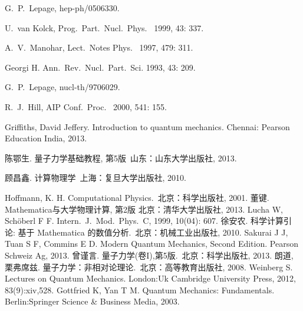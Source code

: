 \documentclass[cs4size,titlepage,twoside]{ctexart}
\begin{document}
\begin{thebibliography}{b}

	G.~P.~Lepage,
	hep-ph/0506330.

	U.~van Kolck,
	Prog.\ Part.\ Nucl.\ Phys.\  %
    1999, 43: 337.

     A.~V.~Manohar,
     Lect.\ Notes Phys.\  %
     1997, 479: 311.

	Georgi H.
    Ann.\ Rev.\ Nucl.\ Part.\ Sci. %
    1993, 43: 209.


	G.~P.~Lepage,
	nucl-th/9706029.

	R.~J.~Hill,
	AIP Conf.\ Proc.\  %
    2000, 541: 155.

	Griffiths, David Jeffery. Introduction to quantum mechanics. Chennai: Pearson Education India, 2013.


	陈鄂生. 量子力学基础教程, 第5版\ 山东：山东大学出版社, 2013.

	顾昌鑫. 计算物理学\ 上海：复旦大学出版社, 2010.

	Hoffmann, K. H. Computational Physics.\ 北京：科学出版社, 2001.
	董键. Mathematica与大学物理计算, 第2版 北京：清华大学出版社, 2013.
	Lucha W, Schöberl F F. Intern.\ J.\ Mod.\ Phys.\ C, 1999, 10(04): 607.%
	徐安农. 科学计算引论: 基于 Mathematica 的数值分析.\ 北京：机械工业出版社, 2010.
	Sakurai J J, Tuan S F, Commins E D. Modern Quantum Mechanics, Second Edition. Pearson Schweiz Ag, 2013.
	曾谨言. 量子力学(卷I),第5版.\ 北京：科学出版社, 2013.
	朗道, 栗弗席兹. 量子力学：非相对论理论.\ 北京：高等教育出版社, 2008.
	Weinberg S. Lectures on Quantum Mechanics. London:Uk Cambridge University Press, 2012, 83(9):xiv,528.
	Gottfried K, Yan T M. Quantum Mechanics: Fundamentals. Berlin:Springer Science \& Business Media, 2003.


\end{thebibliography}
\end{document}
